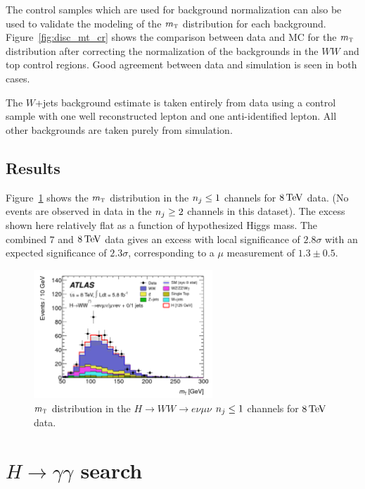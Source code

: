 The control samples which are used for background normalization can also be used to validate the modeling of the $m_{\textrm{\footnotesize\sc t}}$ distribution for each background. Figure~\ref{fig:disc_mt_cr} shows the comparison between data and MC for the $m_{\textrm{\footnotesize\sc t}}$ distribution after correcting the normalization of the backgrounds in the $WW$ and top control regions. Good agreement between data and simulation is seen in both cases. 

The $W$+jets background estimate is taken entirely from data using a control sample with one well reconstructed lepton and one anti-identified lepton. All other backgrounds are taken purely from simulation. 

\subsection{Results}

Figure~\ref{fig:disc_mt} shows the $m_{\textrm{\footnotesize\sc t}}$ distribution in the $n_j \leq 1$ channels for $8 \TeV$ data. (No events are observed in data in the $n_j \geq 2$ channels in this dataset). The excess shown here relatively flat as a function of hypothesized Higgs mass. The combined $7$ and $8\TeV$ data gives an excess with local significance of $2.8\sigma$ with an expected significance of $2.3\sigma$, corresponding to a $\mu$ measurement of $1.3\pm 0.5$. 

\begin{figure}[h!]
  \centering
  \captionsetup{justification=centering}
  \includegraphics[width=0.6\textwidth]{figures/discovery_mt}
  \caption{$m_{\textrm{\footnotesize\sc t}}$ distribution in the $H\to WW \to e\nu\mu\nu$ $n_j \leq 1$ channels for $8 \TeV$ data\cite{Discovery}.}
  \label{fig:disc_mt}
\end{figure}


\section{$H\to\gamma\gamma$ search}

